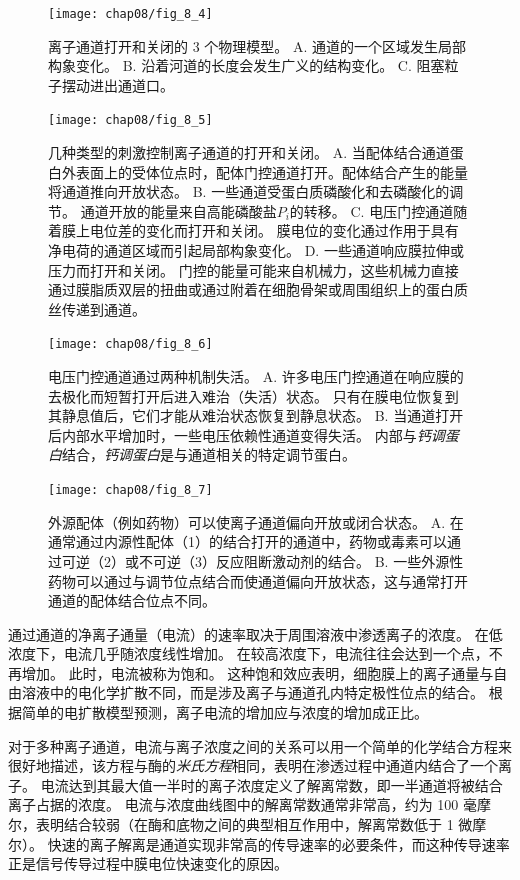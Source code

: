 \begin{figure}[htbp]
	\centering
	\texttt{[image: chap08/fig\_8\_4]}
	\caption{离子通道打开和关闭的 3 个物理模型。
		A. 通道的一个区域发生局部构象变化。
		B. 沿着河道的长度会发生广义的结构变化。
		C. 阻塞粒子摆动进出通道口。}
	\label{fig:8_4}
\end{figure}


\begin{figure}[htbp]
	\centering
	\texttt{[image: chap08/fig\_8\_5]}
	\caption{几种类型的刺激控制离子通道的打开和关闭。
		A. 当配体结合通道蛋白外表面上的受体位点时，配体门控通道打开。配体结合产生的能量将通道推向开放状态。
		B. 一些通道受蛋白质磷酸化和去磷酸化的调节。
		通道开放的能量来自高能磷酸盐$P_i$的转移。
		C. 电压门控通道随着膜上电位差的变化而打开和关闭。
		膜电位的变化通过作用于具有净电荷的通道区域而引起局部构象变化。
		D. 一些通道响应膜拉伸或压力而打开和关闭。
		门控的能量可能来自机械力，这些机械力直接通过膜脂质双层的扭曲或通过附着在细胞骨架或周围组织上的蛋白质丝传递到通道。}
	\label{fig:8_5}
\end{figure}


\begin{figure}[htbp]
	\centering
	\texttt{[image: chap08/fig\_8\_6]}
	\caption{电压门控通道通过两种机制失活。
		A. 许多电压门控通道在响应膜的去极化而短暂打开后进入难治（失活）状态。
		只有在膜电位恢复到其静息值后，它们才能从难治状态恢复到静息状态。
		B. 当通道打开后内部水平增加时，一些电压依赖性通道变得失活。
		内部与\textit{钙调蛋白}结合，\textit{钙调蛋白}是与通道相关的特定调节蛋白。}
	\label{fig:8_6}
\end{figure}


\begin{figure}[htbp]
	\centering
	\texttt{[image: chap08/fig\_8\_7]}
	\caption{外源配体（例如药物）可以使离子通道偏向开放或闭合状态。
		A. 在通常通过内源性配体（1）的结合打开的通道中，药物或毒素可以通过可逆（2）或不可逆（3）反应阻断激动剂的结合。
		B. 一些外源性药物可以通过与调节位点结合而使通道偏向开放状态，这与通常打开通道的配体结合位点不同。}
	\label{fig:8_7}
\end{figure}


通过通道的净离子通量（电流）的速率取决于周围溶液中渗透离子的浓度。
在低浓度下，电流几乎随浓度线性增加。
在较高浓度下，电流往往会达到一个点，不再增加。
此时，电流被称为饱和。
这种饱和效应表明，细胞膜上的离子通量与自由溶液中的电化学扩散不同，而是涉及离子与通道孔内特定极性位点的结合。
根据简单的电扩散模型预测，离子电流的增加应与浓度的增加成正比。


对于多种离子通道，电流与离子浓度之间的关系可以用一个简单的化学结合方程来很好地描述，该方程与酶的\textit{米氏方程}相同，表明在渗透过程中通道内结合了一个离子。
电流达到其最大值一半时的离子浓度定义了解离常数，即一半通道将被结合离子占据的浓度。
电流与浓度曲线图中的解离常数通常非常高，约为 100 毫摩尔，表明结合较弱（在酶和底物之间的典型相互作用中，解离常数低于 1 微摩尔）。
快速的离子解离是通道实现非常高的传导速率的必要条件，而这种传导速率正是信号传导过程中膜电位快速变化的原因。


